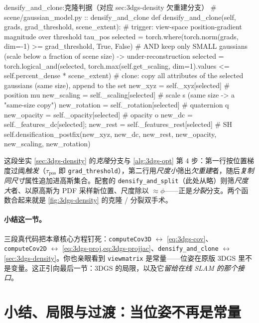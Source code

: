 \begin{codebox}[Python]{densify\_and\_clone:克隆判据（对应 sec:3dgs-density 欠重建分支）}
# scene/gaussian_model.py :: densify_and_clone
def densify_and_clone(self, grads, grad_threshold, scene_extent):
    # trigger: view-space position-gradient magnitude over threshold tau_pos
    selected = torch.where(torch.norm(grads, dim=-1) >= grad_threshold, True, False)
    # AND keep only SMALL gaussians (scale below a fraction of scene size) -> under-reconstruction
    selected = torch.logical_and(selected,
        torch.max(self.get_scaling, dim=1).values <= self.percent_dense * scene_extent)
    # clone: copy all attributes of the selected gaussians (same size), append to the set
    new_xyz      = self._xyz[selected]        # position  mu
    new_scaling  = self._scaling[selected]    # scale  s   (same size -> a "same-size copy")
    new_rotation = self._rotation[selected]   # quaternion q
    new_opacity  = self._opacity[selected]    # opacity  o
    new_dc       = self._features_dc[selected]; new_rest = self._features_rest[selected]  # SH
    self.densification_postfix(new_xyz, new_dc, new_rest, new_opacity, new_scaling, new_rotation)
\end{codebox}

\noindent{}这段坐实 \cref{sec:3dgs-density} 的\emph{克隆}分支与 \cref{alg:3dgs-opt} 第 4 步：第一行按位置梯度过阈\emph{触发}（$\tau_{\mathrm{pos}}$ 即 \texttt{grad\_threshold}），第二行用\emph{尺度小}筛出\emph{欠重建}者，随后\emph{复制同尺寸}属性追加进高斯集合。配套的 \texttt{densify\_and\_split}（此处从略）则筛\emph{尺度大}者、以原高斯为 PDF 采样新位置、尺度除以 $\approx\phi$——正是\emph{分裂}分支。两个函数合起来就是 \cref{fig:3dgs-density} 的克隆 / 分裂双手术。

\paragraph{小结这一节。}
三段真代码把本章核心方程钉死：\texttt{computeCov3D} $\leftrightarrow$ \cref{eq:3dgs-cov}、\texttt{computeCov2D} $\leftrightarrow$ \cref{eq:3dgs-proj,eq:3dgs-projjac}、\texttt{densify\_and\_clone} $\leftrightarrow$ \cref{sec:3dgs-density}。你也亲眼看到 \texttt{viewmatrix} 是常量——位姿在原版 3DGS 里不是变量。这正引向最后一节：3DGS 的局限，以及它\emph{留给在线 SLAM 的那个接口}。

\section{小结、局限与过渡：当位姿不再是常量}
\label{sec:3dgs-limits}

